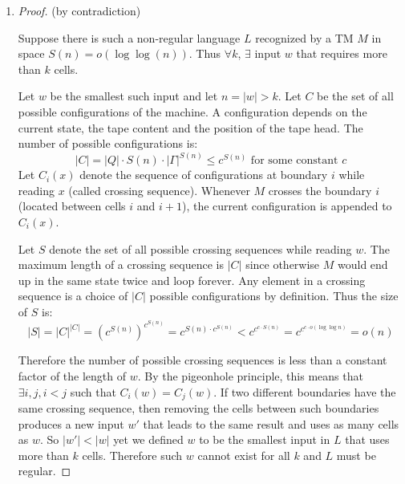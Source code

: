 \documentclass{article}
\begin{document}
\begin{enumerate}
The trick is to keep a counter for $n$ which we shift through our pass of the tape, incrementing while we process the $a$'s and decrementing through the $b$'s. At the end, we only need to check that the counter is 0. The shifting, incrementing and decrementing operations all take $O(\log n)$ steps. At every step of our pass (of which there are $n$), we shift and increase/decrease the counter. Our result time complexity is then $O(n \log n)$.

In order to show that $O(n \log n)$ is the best possible, we rely on the proven theorem (by Hartmanis, Lewis \& Stearns) that any single-tape machine running in time $o(n \log n)$ can only recognize regular languages and the fact that $L$ is clearly not regular.

\item \begin{proof}(by contradiction)

Suppose there is such a non-regular language $L$ recognized by a TM $M$ in space $S(n)=o(\log \log(n))$. Thus $\forall k$, $\exists$ input $w$ that requires more than $k$ cells. 

Let $w$ be the smallest such input and let $n=|w|>k$. Let $C$ be the set of all possible configurations of the machine. A configuration depends on the current state, the tape content and the position of the tape head. The number of possible configurations is:
$$ |C| = |Q| \cdot S(n) \cdot |\Gamma|^{S(n)} \leq c^{S(n)} \text{ for some constant }c$$
Let $C_i(x)$ denote the sequence of configurations at boundary $i$ while reading $x$ (called crossing sequence). Whenever $M$ crosses the boundary $i$ (located between cells $i$ and $i+1$), the current configuration is appended to $C_i(x)$.

Let $S$ denote the set of all possible crossing sequences while reading $w$. The maximum length of a crossing sequence is $|C|$ since otherwise $M$ would end up in the same state twice and loop forever. Any element in a crossing sequence is a choice of $|C|$ possible configurations by definition. Thus the size of $S$ is:
$$ |S| = |C|^{|C|} = (c^{S(n)})^{c^{S(n)}} = c^{S(n) \cdot c^{S(n)}} < c^{c^{c \cdot S(n)}} = c^{c^{c \cdot o(\log \log n)}} = o(n)$$

Therefore the number of possible crossing sequences is less than a constant factor of the length of $w$. By the pigeonhole principle, this means that $\exists i,j,i<j$ such that $C_i(w)=C_j(w)$. If two different boundaries have the same crossing sequence, then removing the cells between such boundaries produces a new input $w'$ that leads to the same result and uses as many cells as $w$. So $|w'|<|w|$ yet we defined $w$ to be the smallest input in $L$ that uses more than $k$ cells. Therefore such $w$ cannot exist for all $k$ and $L$ must be regular.


\end{proof}
\end{enumerate}
\end{document}
